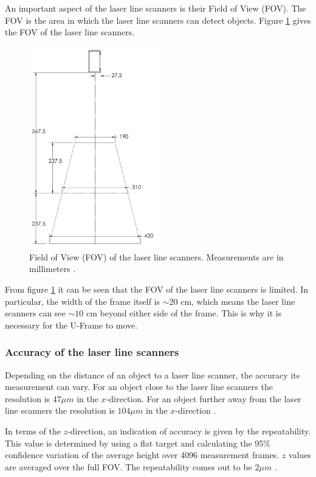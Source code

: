 An important aspect of the laser line scanners is their Field of View (FOV).
The FOV is the area in which the laser line scanners can detect objects. Figure \ref{fig:lls_fov} gives the FOV of the laser line scanners.
\begin{figure}[H]
    \centering
    \includegraphics[width=0.5\textwidth]{images/laser_line_scanner_fov.png}
    \caption{Field of View (FOV) of the laser line scanners. Measurements are in millimeters \cite{gocator2650FOV}.}
    \label{fig:lls_fov}
\end{figure}
From figure \ref{fig:lls_fov} it can be seen that the FOV of the laser line scanners is limited. In particular, the width of the frame itself is $\sim 20$ cm, which means the laser line scanners can see $\sim 10$ cm beyond either side of the frame. This is why it is necessary for the U-Frame to move.

\subsubsection{Accuracy of the laser line scanners} \label{sssec:lls_accuracy}
Depending on the distance of an object to a laser line scanner, the accuracy its measurement can vary. For an object close to the laser line scanners the resolution is $47 \mu m$ in the $x$-direction. For an object further away from the laser line scanners the resolution is $104 \mu m$ in the $x$-direction \cite{gocator2650datasheet}. 

In terms of the $z$-direction, an indication of accuracy is given by the repeatability. This value is determined by using a flat target and calculating the 95\% confidence variation of the average height over 4096 measurement frames. $z$ values are averaged over the full FOV. The repeatability comes out to be $2 \mu m$ \cite{gocator2650datasheet}.

